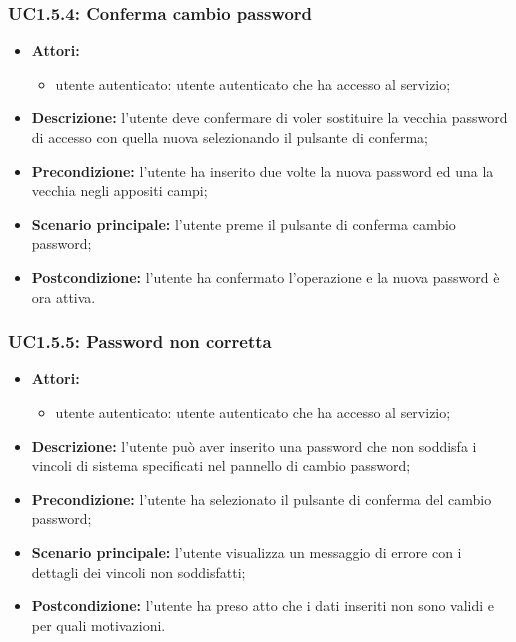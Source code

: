 \subsubsection{UC1.5.4: Conferma cambio password}
\begin{itemize}
	\item \textbf{Attori:}
	\begin{itemize}
		\item utente autenticato: utente autenticato che ha accesso al servizio;
	\end{itemize}
	\item \textbf{Descrizione:} l'utente deve confermare di voler sostituire la vecchia password di accesso con quella nuova selezionando il pulsante di conferma;
	\item \textbf{Precondizione:} l'utente ha inserito due volte la nuova password ed una la vecchia negli appositi campi;
	\item \textbf{Scenario principale:} l'utente preme il pulsante di conferma cambio password;
	\item \textbf{Postcondizione:} l'utente ha confermato l'operazione e la nuova password è ora attiva.
\end{itemize}

\subsubsection{UC1.5.5: Password non corretta}
\begin{itemize}
	\item \textbf{Attori:}
	\begin{itemize}
		\item utente autenticato: utente autenticato che ha accesso al servizio;
	\end{itemize}
	\item \textbf{Descrizione:} l'utente può aver inserito una password che non soddisfa i vincoli di sistema specificati nel pannello di cambio password;
	\item \textbf{Precondizione:} l'utente ha selezionato il pulsante di conferma del cambio password;
	\item \textbf{Scenario principale:} l'utente visualizza un messaggio di errore con i dettagli dei vincoli non soddisfatti;
	\item \textbf{Postcondizione:} l'utente ha preso atto che i dati inseriti non sono validi e per quali motivazioni.
\end{itemize}

